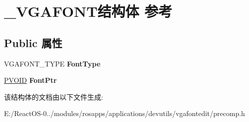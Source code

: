 \hypertarget{struct___v_g_a_f_o_n_t}{}\section{\+\_\+\+V\+G\+A\+F\+O\+N\+T结构体 参考}
\label{struct___v_g_a_f_o_n_t}
\subsection*{Public 属性}
\begin{DoxyCompactItemize}
\item 
\mbox{\label{struct___v_g_a_f_o_n_t_a3ace5e182135378a99a76c8062c7390b}} 
V\+G\+A\+F\+O\+N\+T\+\_\+\+T\+Y\+PE {\bfseries Font\+Type}
\item 
\mbox{\label{struct___v_g_a_f_o_n_t_ab648a4bb6f354e19e4808cf7ef9b9264}} 
\hyperlink{interfacevoid}{P\+V\+O\+ID} {\bfseries Font\+Ptr}
\end{DoxyCompactItemize}


该结构体的文档由以下文件生成\+:\begin{DoxyCompactItemize}
\item 
E\+:/\+React\+O\+S-\/0../modules/rosapps/applications/devutils/vgafontedit/precomp.\+h\end{DoxyCompactItemize}
